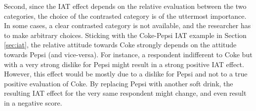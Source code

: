 \documentclass[12pt]{book}
\begin{document}
Second, since the IAT effect depends on the relative evaluation between the two categories, the choice of the contrasted category is of the uttermost importance. In some cases, a clear contrasted category is not available, and the researcher has to make arbitrary choices. 
Sticking with the Coke-Pepsi IAT example in Section \ref{sec:iat}, the relative attitude towards Coke strongly depends on the attitude towards Pepsi (and vice-versa). For instance, a respondent indifferent to Coke but with a very strong dislike for Pepsi might result in a strong positive IAT effect. 
However, this effect would be mostly due to a dislike for Pepsi and not to a true positive evaluation of Coke. By replacing Pepsi with another soft drink, the resulting IAT effect for the very same respondent might change, and even result in a negative score.
\end{document}
